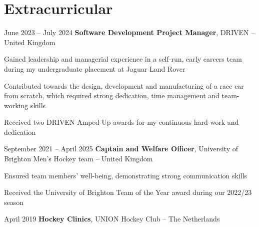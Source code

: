 %	
%	
%	

%	

	\section{Extracurricular}
	
	\begin{twocolentry}{
			June 2023 – July 2024
		}
		\textbf{Software Development Project Manager}, DRIVEN -- United Kingdom\end{twocolentry}
	
	\vspace{0.10 cm}
	\begin{onecolentry}
		\begin{highlights}
			\item Gained leadership and managerial experience in a self-run, early careers team during my undergraduate placement at Jaguar Land Rover
			\item Contributed towards the design, development and manufacturing of a race car from scratch, which required strong dedication, time management and team-working skills
			\item Received two DRIVEN Amped-Up awards for my continuous hard work and dedication
		\end{highlights}
	\end{onecolentry}
	
	\vspace{0.2 cm}
	
	\begin{twocolentry}{
			September 2021 – April 2025
		}
		\textbf{Captain and Welfare Officer}, University of Brighton Men’s Hockey team -- United Kingdom\end{twocolentry}
	
	\vspace{0.10 cm}
	\begin{onecolentry}
		\begin{highlights}
			\item Ensured team members’ well-being, demonstrating strong communication skills
			\item Received the University of Brighton Team of the Year award during our 2022/23 season
		\end{highlights}
	\end{onecolentry}
	
	\vspace{0.2 cm}
	
	\begin{twocolentry}{
			April 2019
		}
		\textbf{Hockey Clinics}, UNION Hockey Club -- The Netherlands\end{twocolentry}
	
